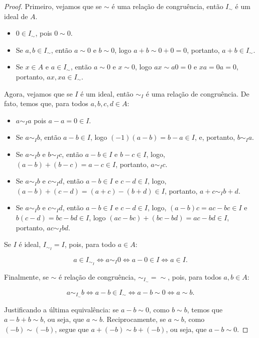 \begin{proof}
Primeiro, vejamos que se $\sim$ é uma relação de congruência, então $I_\sim$ é um ideal de $A$.

\begin{itemize}
\item $0 \in I_\sim$, pois $0\sim 0$.
\item Se $a, b \in I_\sim$, então $a\sim 0$ e $b\sim 0$, logo $a+b\sim 0+0=0$, portanto, $a+b \in I_\sim$.
\item Se $x \in A$ e $a \in I_\sim$, então $a\sim 0$ e $x\sim 0$, logo $ax\sim a0=0$ e $xa=0a=0$, portanto, $ax, xa \in I_\sim$.
\end{itemize}

Agora, vejamos que se $I$ é um ideal, então $\sim_I$ é uma relação de congruência. De fato, temos que, para todos $a, b, c, d \in A$:
\begin{itemize}
    \item $a\sim_I a$ pois $a-a=0\in I$.
    \item Se $a\sim_I b$, então $a-b \in I$, logo $(-1)(a-b)=b-a\in I$, e, portanto, $b\sim_I a$.
    \item Se $a\sim_I b$ e $b\sim_I c$, então $a-b \in I$ e $b-c \in I$, logo, $(a-b)+(b-c)=a-c \in I$, portanto, $a\sim_I c$.
    \item Se $a\sim_I b$ e $c\sim_I d$, então $a-b \in I$ e $c-d \in I$, logo, $(a-b)+(c-d)=(a+c)-(b+d)\in I$, portanto, $a+c\sim_I b+d$.
    \item Se $a\sim_I b$ e $c\sim_I d$, então $a-b \in I$ e $c-d \in I$, logo, $(a-b)c=ac-bc\in I$ e $b(c-d)=bc-bd\in I$, logo $(ac-bc)+(bc-bd)=ac-bd\in I$, portanto, $ac\sim_I bd$.
    \end{itemize}

Se $I$ é ideal, $I_{\sim_I}=I$, pois, para todo $a\in A$:

$$a\in I_{\sim_I}\Leftrightarrow a\sim_I 0\Leftrightarrow a-0\in I\Leftrightarrow a\in I.$$

Finalmente, se $\sim$ é relação de congruência, $\sim_{I_\sim}=\sim$, pois, para todos $a, b \in A$:

$$a\sim_{I_\sim} b\Leftrightarrow a-b\in I_\sim \Leftrightarrow a-b\sim 0\Leftrightarrow a\sim b.$$

Justificando a última equivalência: se $a-b\sim 0$, como $b\sim b$, temos que $a-b+b\sim b$, ou seja, que $a\sim b$. Reciprocamente, se $a\sim b$, como $(-b)\sim (-b)$, segue que $a+(-b)\sim b+(-b)$, ou seja, que $a-b\sim 0$.
\end{proof}

